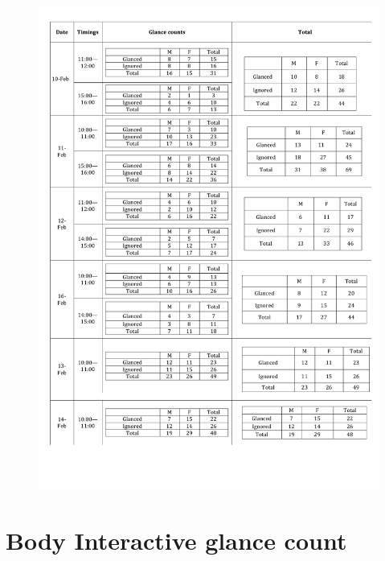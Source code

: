 \begin{appendices}
\begin{figure}[H]
 \centering 
    \includegraphics[width=\textwidth,height=0.8\textheight]{Appendices/8/body-interactive/body-interactive_glances.pdf}
     \label{app:body-interactive-glancecount}%
\end{figure}



\section{Body Interactive glance count}


\end{appendices}
